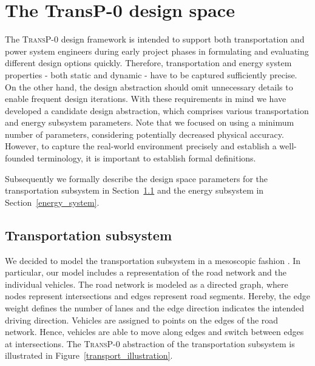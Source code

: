 \section{The \textbf{TransP-0} design space}
\label{proposed_model}
The \textsc{TransP-0} design framework is intended to support both transportation and power system engineers
during early project phases 
in formulating and evaluating different design options quickly. Therefore, transportation and energy system properties - both static and dynamic - have to be captured sufficiently precise. On the other hand, the design abstraction should omit unnecessary details to enable frequent design iterations. With these requirements in mind we have developed a candidate design abstraction, which comprises various transportation and energy subsystem parameters. Note that we focused on using a minimum number of parameters, considering potentially decreased physical accuracy. However, to capture the real-world environment precisely and establish a well-founded terminology, it is important to establish formal definitions.


Subsequently we formally describe the design space parameters for the transportation subsystem in Section~\ref{transport} and the energy subsystem in Section~\ref{energy_system}.

\subsection{Transportation subsystem}
\label{transport}

We decided to model the transportation subsystem in a mesoscopic fashion \cite{burghout2005mesoscopic}. In particular, our model includes a representation of the road network and the individual vehicles. The road network is modeled as a directed graph, where nodes represent intersections and edges represent road segments. Hereby, the edge weight defines the number of lanes and the edge direction indicates the intended driving direction.
Vehicles are assigned to points on the edges of the road network. Hence, vehicles are able to move along edges and switch between edges at intersections. The \textsc{TransP-0} abstraction of the transportation subsystem is illustrated in Figure~\ref{transport_illustration}.

